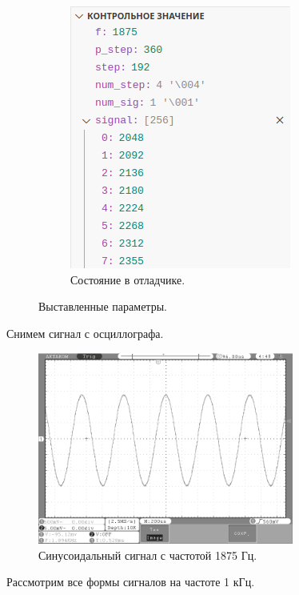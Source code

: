 \begin{figure}[H]
\begin{subfigure}[H]{0.5\textwidth}
         \includegraphics[width=0.8\textwidth]{../image/test4_o_f.png}
         \caption{Состояние в отладчике.}
     \end{subfigure}
        \caption{Выставленные параметры.}
	\end{figure}
	
	Снимем сигнал с осциллографа.
	\begin{figure}[H]
    \centering
    \includegraphics[width=0.75\textwidth]{../image/1875.bmp}
    \caption{Синусоидальный сигнал с частотой 1875 Гц.}
	\end{figure}	
	
	Рассмотрим все формы сигналов на частоте 1 кГц.


